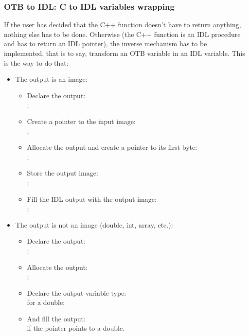 \subsubsection{OTB to IDL: C to IDL variables wrapping}
If the user has decided that the C++ function doesn't have to return anything, nothing else has to be done. Otherwise (the C++ function is an IDL procedure and  has to return an IDL pointer), the inverse mechanism has to be implemented, that is to say, transform an OTB variable in an IDL variable. This is the way to do that:
\begin{itemize}
  \item The output is an image:
    \begin{itemize}
    \item Declare the output:\\ ;
    \item Create a pointer to the input image:\\ ;
    \item Allocate the output and create a pointer to its first byte:\\ ;
    \item Store the output image:\\ ;
    \item Fill the IDL output with the output image:\\ ;
    \end{itemize}
  \item The output is not an image (double, int, array, etc.):
    \begin{itemize}
    \item Declare the output:\\ ;
    \item Allocate the output:\\ ;
    \item Declare the output variable type:\\  for a double;
    \item And fill the output:\\  if the pointer points to a double.
    \end{itemize}
\end{itemize}


